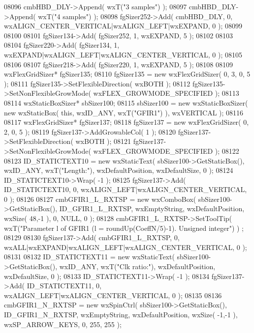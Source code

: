 \begin{DoxyCode}
08096     cmbHBD_DLY->Append( wxT(\textcolor{stringliteral}{"3 samples"}) );
08097     cmbHBD_DLY->Append( wxT(\textcolor{stringliteral}{"4 samples"}) );
08098     fgSizer252->Add( cmbHBD_DLY, 0, wxALIGN\_CENTER\_VERTICAL|wxALIGN\_LEFT|wxEXPAND, 0 );
08099     
08100     
08101     fgSizer134->Add( fgSizer252, 1, wxEXPAND, 5 );
08102     
08103     
08104     fgSizer220->Add( fgSizer134, 1, wxEXPAND|wxALIGN\_LEFT|wxALIGN\_CENTER\_VERTICAL, 0 );
08105     
08106     
08107     fgSizer218->Add( fgSizer220, 1, wxEXPAND, 5 );
08108     
08109     wxFlexGridSizer* fgSizer135;
08110     fgSizer135 = \textcolor{keyword}{new} wxFlexGridSizer( 0, 3, 0, 5 );
08111     fgSizer135->SetFlexibleDirection( wxBOTH );
08112     fgSizer135->SetNonFlexibleGrowMode( wxFLEX\_GROWMODE\_SPECIFIED );
08113     
08114     wxStaticBoxSizer* sbSizer100;
08115     sbSizer100 = \textcolor{keyword}{new} wxStaticBoxSizer( \textcolor{keyword}{new} wxStaticBox( \textcolor{keyword}{this}, wxID\_ANY, wxT(\textcolor{stringliteral}{"GFIR1"}) ), wxVERTICAL );
08116     
08117     wxFlexGridSizer* fgSizer137;
08118     fgSizer137 = \textcolor{keyword}{new} wxFlexGridSizer( 0, 2, 0, 5 );
08119     fgSizer137->AddGrowableCol( 1 );
08120     fgSizer137->SetFlexibleDirection( wxBOTH );
08121     fgSizer137->SetNonFlexibleGrowMode( wxFLEX\_GROWMODE\_SPECIFIED );
08122     
08123     ID_STATICTEXT10 = \textcolor{keyword}{new} wxStaticText( sbSizer100->GetStaticBox(), wxID\_ANY, wxT(\textcolor{stringliteral}{"Length:"}), 
      wxDefaultPosition, wxDefaultSize, 0 );
08124     ID_STATICTEXT10->Wrap( -1 );
08125     fgSizer137->Add( ID_STATICTEXT10, 0, wxALIGN\_LEFT|wxALIGN\_CENTER\_VERTICAL, 0 );
08126     
08127     cmbGFIR1_L_RXTSP = \textcolor{keyword}{new} wxComboBox( sbSizer100->GetStaticBox(), 
      ID_GFIR1_L_RXTSP, wxEmptyString, wxDefaultPosition, wxSize( 48,-1 ), 0, NULL, 0 ); 
08128     cmbGFIR1_L_RXTSP->SetToolTip( wxT(\textcolor{stringliteral}{"Parameter l of GFIR1 (l = roundUp(CoeffN/5)-1). Unsigned integer"}) )
      ;
08129     
08130     fgSizer137->Add( cmbGFIR1_L_RXTSP, 0, wxALL|wxEXPAND|wxALIGN\_LEFT|wxALIGN\_CENTER\_VERTICAL, 0 );
08131     
08132     ID_STATICTEXT11 = \textcolor{keyword}{new} wxStaticText( sbSizer100->GetStaticBox(), wxID\_ANY, wxT(\textcolor{stringliteral}{"Clk ratio:"}), 
      wxDefaultPosition, wxDefaultSize, 0 );
08133     ID_STATICTEXT11->Wrap( -1 );
08134     fgSizer137->Add( ID_STATICTEXT11, 0, wxALIGN\_LEFT|wxALIGN\_CENTER\_VERTICAL, 0 );
08135     
08136     cmbGFIR1_N_RXTSP = \textcolor{keyword}{new} wxSpinCtrl( sbSizer100->GetStaticBox(), 
      ID_GFIR1_N_RXTSP, wxEmptyString, wxDefaultPosition, wxSize( -1,-1 ), wxSP\_ARROW\_KEYS, 0, 255, 255 );

\end{DoxyCode}
